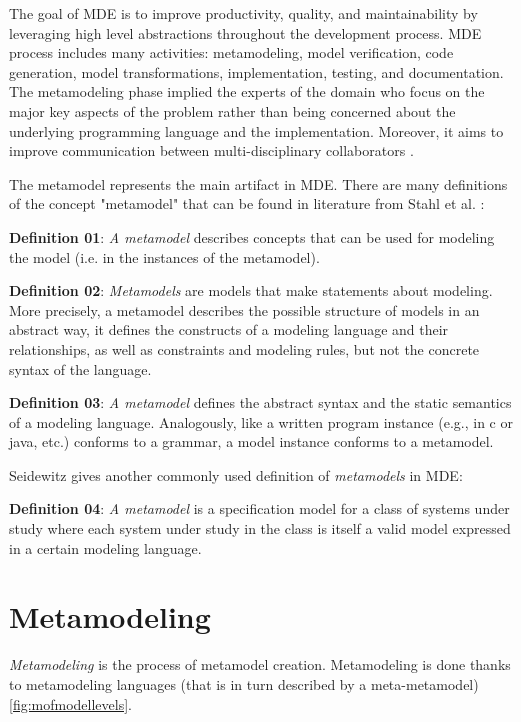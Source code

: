 
The goal of MDE is to improve productivity, quality, and maintainability by leveraging high level abstractions throughout the development process. MDE process includes many activities: metamodeling, model verification, code generation, model transformations, implementation, testing, and documentation. The metamodeling phase implied the experts of the domain who focus on the major key aspects of the problem rather than being concerned about the underlying programming language and the implementation. Moreover, it aims to improve communication between multi-disciplinary collaborators \cite{wortmann2020modeling}.

The metamodel represents the main artifact in MDE. There are many definitions of the concept "metamodel" that can be found in literature from Stahl et al. \cite{stahl2006model}:

\textbf{Definition 01}: \textit{A metamodel} describes concepts that can be used for modeling the model (i.e. in the instances of the metamodel).

\textbf{Definition 02}: \textit {Metamodels} are models that make statements about modeling. More precisely, a metamodel describes the possible structure of models in an abstract way, it defines the constructs of a modeling language and their relationships, as well as constraints and modeling rules, but not the concrete syntax of the language.

\textbf{Definition 03}: \textit{A metamodel} defines the abstract syntax and the static semantics of a modeling language. Analogously, like a written program instance (e.g., in c or java, etc.) conforms to a grammar, a model instance conforms to a metamodel.

Seidewitz \cite{seidewitz2003models} gives another commonly used definition of \textit{metamodels} in MDE:

\textbf{Definition 04}: \textit{A metamodel} is a specification model for a class of systems under study where each system under study in the class is itself a valid model expressed in a certain modeling language.

\section{Metamodeling}
\label{Metamodeling}
\textit{Metamodeling} is the process of metamodel creation. Metamodeling is done thanks to metamodeling languages (that is in turn described by a meta-metamodel) \ref{fig:mofmodellevels}.

